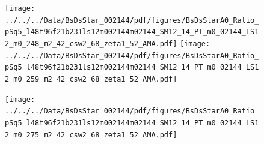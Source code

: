 \documentclass[a4paper,10pt]{article}
\begin{document}
\clearpage
\begin{figure}[p]
 \texttt{[image: ../../../Data/BsDsStar\_002144/pdf/figures/BsDsStarA0\_Ratio\_pSq5\_l48t96f21b231ls12m002144m02144\_SM12\_14\_PT\_m0\_02144\_LS12\_m0\_248\_m2\_42\_csw2\_68\_zeta1\_52\_AMA.pdf]} 
 \texttt{[image: ../../../Data/BsDsStar\_002144/pdf/figures/BsDsStarA0\_Ratio\_pSq5\_l48t96f21b231ls12m002144m02144\_SM12\_14\_PT\_m0\_02144\_LS12\_m0\_259\_m2\_42\_csw2\_68\_zeta1\_52\_AMA.pdf]} 
 \end{figure}
\begin{figure}[p]
 \texttt{[image: ../../../Data/BsDsStar\_002144/pdf/figures/BsDsStarA0\_Ratio\_pSq5\_l48t96f21b231ls12m002144m02144\_SM12\_14\_PT\_m0\_02144\_LS12\_m0\_275\_m2\_42\_csw2\_68\_zeta1\_52\_AMA.pdf]} 
 \end{figure}
\clearpage
\end{document}
